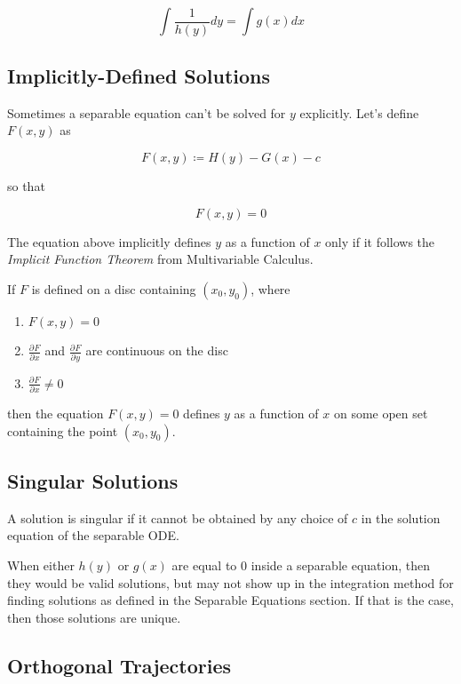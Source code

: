 \[
    \int \frac{1}{h(y)} dy = \int g(x) dx
\]

\subsection{Implicitly-Defined Solutions}

Sometimes a separable equation can't be solved for $y$ explicitly. Let's define $F(x,y)$ as

\[
    F(x,y) \coloneq H(y) - G(x) - c
\]

so that

\[
    F(x,y) = 0
\]

The equation above implicitly defines $y$ as a function of $x$ only if it follows the \textit{Implicit Function Theorem} from Multivariable Calculus.

\begin{theorem}
    If $F$ is defined on a disc containing $(x_0, y_0)$, where

    \begin{enumerate}
        \item $F(x,y) = 0$
        \item $\frac{\partial^{}F}{\partial^{}x}$ and $\frac{\partial^{}F}{\partial^{}y}$ are continuous on the disc
        \item $\frac{\partial^{}F}{\partial^{}x} \ne 0$
    \end{enumerate}

    then the equation $F(x,y) = 0$ defines $y$ as a function of $x$ on some open set containing the point $(x_0, y_0)$.
\end{theorem}

\subsection{Singular Solutions}

\begin{definition}
    A solution is singular if it cannot be obtained by any choice of $c$ in the solution equation of the separable ODE.
\end{definition}

When either $h(y)$ or $g(x)$ are equal to $0$ inside a separable equation, then they would be valid solutions, but may not show up in the integration method for finding solutions as defined in the Separable Equations section. If that is the case, then those solutions are unique.

\subsection{Orthogonal Trajectories}

